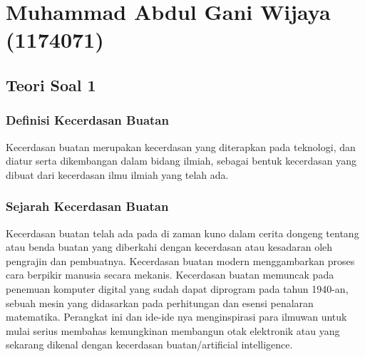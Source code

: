 
\section{Muhammad Abdul Gani Wijaya (1174071)}
\subsection{Teori Soal 1}
\subsubsection{Definisi Kecerdasan Buatan}
Kecerdasan buatan merupakan kecerdasan yang diterapkan pada teknologi, dan diatur serta dikembangan dalam bidang ilmiah, sebagai bentuk kecerdasan yang dibuat dari kecerdasan ilmu ilmiah yang telah ada.
\subsubsection{Sejarah Kecerdasan Buatan}
Kecerdasan buatan telah ada pada di zaman kuno dalam cerita dongeng tentang atau benda buatan yang diberkahi dengan kecerdasan atau kesadaran oleh pengrajin dan pembuatnya. Kecerdasan buatan modern menggambarkan proses cara berpikir manusia secara mekanis. Kecerdasan buatan memuncak pada penemuan komputer digital yang sudah dapat diprogram pada tahun 1940-an, sebuah mesin yang didasarkan pada perhitungan dan esensi penalaran matematika. Perangkat ini dan ide-ide nya menginspirasi para ilmuwan untuk mulai serius membahas kemungkinan membangun otak elektronik atau yang sekarang dikenal dengan kecerdasan buatan/artificial intelligence.
